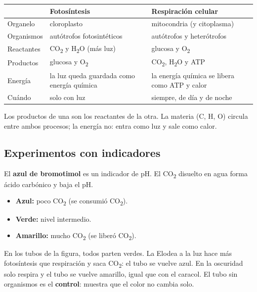 \begin{center}\small
\begin{tabularx}{\linewidth}{@{}>{\raggedright\arraybackslash\hsize=0.42\hsize}X>{\raggedright\arraybackslash\hsize=1.29\hsize}X>{\raggedright\arraybackslash\hsize=1.29\hsize}X@{}}
\toprule
 & \textbf{Fotosíntesis} & \textbf{Respiración celular} \\
\midrule
Organelo & cloroplasto & mitocondria (y citoplasma) \\
Organismos & autótrofos fotosintéticos & autótrofos y heterótrofos \\
Reactantes & CO\textsubscript{2} y H\textsubscript{2}O (más luz) & glucosa y O\textsubscript{2} \\
Productos & glucosa y O\textsubscript{2} & CO\textsubscript{2}, H\textsubscript{2}O y ATP \\
Energía & la luz queda guardada como energía química & la energía química se libera como ATP y calor \\
Cuándo & solo con luz & siempre, de día y de noche \\
\bottomrule
\end{tabularx}
\end{center}
 
\begin{clave} Los productos de una son los reactantes de la otra. La materia (C, H, O) circula entre ambos procesos; la energía no: entra como luz y sale como calor.\end{clave}
\subsection{Experimentos con indicadores}
El \textbf{azul de bromotimol} es un indicador de pH. El CO\textsubscript{2} disuelto en agua forma ácido carbónico y baja el pH.

 
\begin{itemize}
  \item \textbf{Azul:} poco CO\textsubscript{2} (se consumió CO\textsubscript{2}).
  \item \textbf{Verde:} nivel intermedio.
  \item \textbf{Amarillo:} mucho CO\textsubscript{2} (se liberó CO\textsubscript{2}).
\end{itemize}
 

En los tubos de la figura, todos parten verdes. La Elodea a la luz hace más fotosíntesis que respiración y saca CO\textsubscript{2}: el tubo se vuelve azul. En la oscuridad solo respira y el tubo se vuelve amarillo, igual que con el caracol. El tubo sin organismos es el \textbf{control}: muestra que el color no cambia solo.

